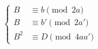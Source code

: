 \documentclass{article}
\begin{document}
$$
\begin{cases}B &\equiv b \pmod{2a} \\
B &\equiv b' \pmod{2a'} \\
B^{2} &\equiv D \pmod{4aa'}\end{cases}
$$
\end{document}
